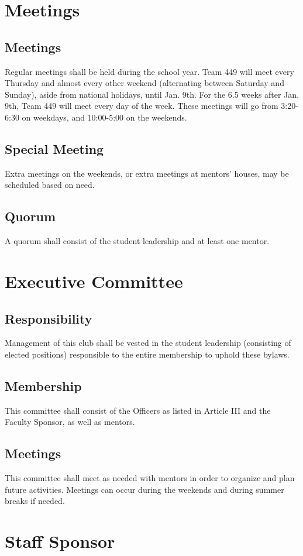 \documentclass[12pt, a4paper]{article}
\begin{document}
\section{Meetings}
\subsection{Meetings}
Regular meetings shall be held during the school year.  Team 449 will meet every Thursday and almost every other weekend (alternating between Saturday and Sunday), aside from national holidays, until Jan. 9th. For the 6.5 weeks after Jan. 9th,  Team 449 will meet every day of the week.  These meetings will go from 3:20-6:30 on weekdays, and 10:00-5:00 on the weekends. 
\subsection{Special Meeting}
Extra meetings on the weekends, or extra meetings at mentors’ houses, may be scheduled based on need.
\subsection{Quorum}
A quorum shall consist of the student leadership and at least one mentor.
\section{Executive Committee}
\subsection{Responsibility}
Management of this club shall be vested in the student leadership (consisting of elected positions) responsible to the entire membership to uphold these bylaws.
\subsection{Membership}
This committee shall consist of the Officers as listed in Article III and the Faculty Sponsor, as well as mentors.
\subsection{Meetings}
This committee shall meet as needed with mentors in order to organize and plan future activities. Meetings can occur during the weekends and during summer breaks if needed.
\section{Staff Sponsor}
\end{document}
